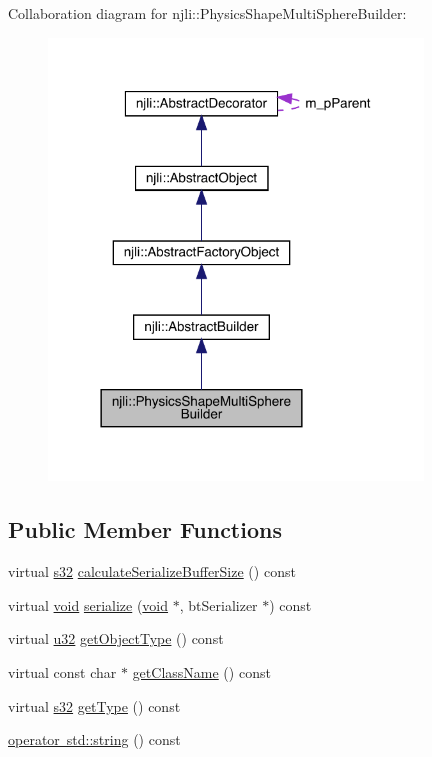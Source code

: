 Collaboration diagram for njli\+:\+:Physics\+Shape\+Multi\+Sphere\+Builder\+:\nopagebreak
\begin{figure}[H]
\begin{center}
\leavevmode
\includegraphics[width=282pt]{classnjli_1_1_physics_shape_multi_sphere_builder__coll__graph}
\end{center}
\end{figure}
\subsection*{Public Member Functions}
\begin{DoxyCompactItemize}
\item 
virtual \mbox{\hyperlink{_util_8h_aa62c75d314a0d1f37f79c4b73b2292e2}{s32}} \mbox{\hyperlink{classnjli_1_1_physics_shape_multi_sphere_builder_a902545dd1e34e54fdf9b8c72d9ac9998}{calculate\+Serialize\+Buffer\+Size}} () const
\item 
virtual \mbox{\hyperlink{_thread_8h_af1e856da2e658414cb2456cb6f7ebc66}{void}} \mbox{\hyperlink{classnjli_1_1_physics_shape_multi_sphere_builder_a862367a2b4f02efb10f9cdcbc5656df8}{serialize}} (\mbox{\hyperlink{_thread_8h_af1e856da2e658414cb2456cb6f7ebc66}{void}} $\ast$, bt\+Serializer $\ast$) const
\item 
virtual \mbox{\hyperlink{_util_8h_a10e94b422ef0c20dcdec20d31a1f5049}{u32}} \mbox{\hyperlink{classnjli_1_1_physics_shape_multi_sphere_builder_a44c971909b48ec8c5e5cbf7a147df377}{get\+Object\+Type}} () const
\item 
virtual const char $\ast$ \mbox{\hyperlink{classnjli_1_1_physics_shape_multi_sphere_builder_a66426aca342f51ea918d64690a74d4c5}{get\+Class\+Name}} () const
\item 
virtual \mbox{\hyperlink{_util_8h_aa62c75d314a0d1f37f79c4b73b2292e2}{s32}} \mbox{\hyperlink{classnjli_1_1_physics_shape_multi_sphere_builder_a12ce7d034b9952a770362acb3b4ab0f3}{get\+Type}} () const
\item 
\mbox{\hyperlink{classnjli_1_1_physics_shape_multi_sphere_builder_a78cdf33a751ae2d2edd4a2a45b90d0a8}{operator std\+::string}} () const
\end{DoxyCompactItemize}

